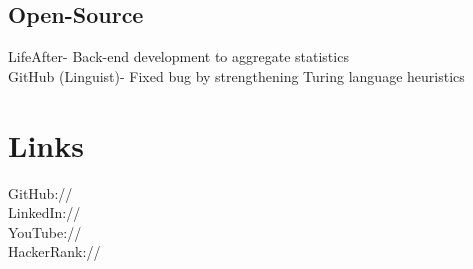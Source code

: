 \documentclass[]{deedy-resume-openfont}
\begin{document}
\begin{minipage}[t]{0.33\textwidth}
\subsection{Open-Source}
LifeAfter- Back-end development to aggregate statistics \\
\vspace{2mm}
GitHub (Linguist)- Fixed bug by strengthening Turing language heuristics
\sectionsep



\section{Links} 
GitHub:// \href{https://github.com/MathBunny}{} \\
LinkedIn://  \href{https://www.linkedin.com/in/horatiulazu}{} \\
YouTube://  \href{https://www.youtube.com/user/SoftwareEngenius}{} \\
HackerRank://  \href{https://www.hackerrank.com/MathBunny123#!}{} \\
\sectionsep

%
%

\end{minipage} 
\hfill
\end{document}
